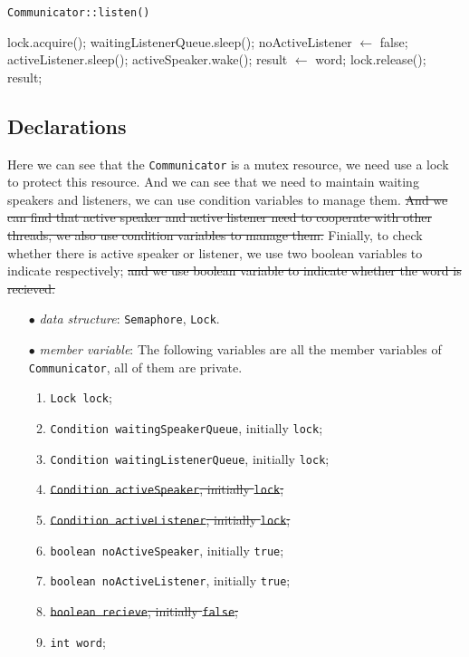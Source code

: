\documentclass{article}
\begin{document}
\begin{spacing}{1.1}
    \begin{algorithm}
      \caption{\texttt{Communicator::listen()}}
      \begin{algorithmic}[1]
	\State lock.acquire();
	\State waitingListenerQueue.sleep();
	\EndIf
	\State noActiveListener $\leftarrow$ false;
	\State activeListener.sleep();
	\EndIf
	\State activeSpeaker.wake();
	\State result $\leftarrow$ word;
	\State lock.release();
	\Return result;
      \end{algorithmic}
    \end{algorithm}

\subsection{Declarations}
Here we can see that the \texttt{Communicator} is a mutex resource, we need use
a lock to protect this resource. And we can see that we need to maintain waiting
speakers and listeners, we can use condition variables to manage them. {\color{red}\sout{And we 
can find that active speaker and active listener need to cooperate with other
threads, we also use condition variables to manage them.}} Finially, to check whether
there is active speaker or listener, we use two boolean variables to indicate 
respectively; {\color{red}\sout{and we use boolean variable to indicate whether the word is recieved.}}
\begin{enumerate}
  \item[$\bullet$] \textit{data structure}: \texttt{Semaphore}, \texttt{Lock}.
  \item[$\bullet$] \textit{member variable}:
    The following variables are all the member variables of \texttt{Communicator},
    all of them are private. 
    \begin{enumerate}
      \item \texttt{Lock lock};
      \item \texttt{Condition waitingSpeakerQueue}, initially \texttt{lock};
      \item \texttt{Condition waitingListenerQueue}, initially \texttt{lock};
      \item {\color{red}\sout{\texttt{Condition activeSpeaker}, initially \texttt{lock};}}
      \item {\color{red}\sout{\texttt{Condition activeListener}, initially \texttt{lock};}}
      \item \texttt{boolean noActiveSpeaker}, initially \texttt{true};
      \item \texttt{boolean noActiveListener}, initially \texttt{true};
      \item {\color{red}\sout{\texttt{boolean recieve}, initially \texttt{false};}}
      \item \texttt{int word};
    \end{enumerate}
\end{enumerate}


\end{spacing}
\end{document}
